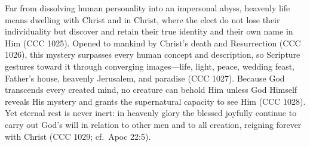 Far from dissolving human personality into an impersonal abyss, heavenly life means dwelling with Christ and in Christ, where the elect do not lose their individuality but discover and retain their true identity and their own name in Him (CCC 1025). Opened to mankind by Christ's death and Resurrection (CCC 1026), this mystery surpasses every human concept and description, so Scripture gestures toward it through converging images---life, light, peace, wedding feast, Father's house, heavenly Jerusalem, and paradise (CCC 1027). Because God transcends every created mind, no creature can behold Him unless God Himself reveals His mystery and grants the supernatural capacity to see Him (CCC 1028). Yet eternal rest is never inert: in heavenly glory the blessed joyfully continue to carry out God's will in relation to other men and to all creation, reigning forever with Christ (CCC 1029; cf.\ Apoc 22:5).
